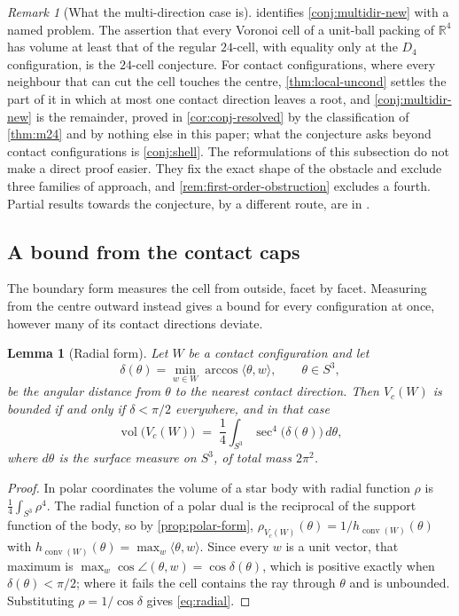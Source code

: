 \documentclass[11pt,reqno]{amsart}
\renewcommand{\_}{\origunderscore\allowbreak}
\numberwithin{equation}{section}
\theoremstyle{plain}
\newtheorem{lem}[thm]{Lemma}
\theoremstyle{definition}
\theoremstyle{remark}
\newtheorem{remark}[thm]{Remark}
\DeclareMathOperator{\vol}{vol}
\DeclareMathOperator{\conv}{conv}
\begin{document}
\begin{remark}[What the multi-direction case is]\label{rem:is-24cell}
 identifies \cref{conj:multidir-new} with a named
problem. The assertion that every Voronoi cell of a unit-ball
packing of $\mathbb{R}^4$ has volume at least that of the regular
$24$-cell, with equality only at the $D_4$ configuration, is the
$24$-cell conjecture. For contact configurations, where every
neighbour that can cut the cell touches the centre,
\cref{thm:local-uncond} settles the part of it in which at most one
contact direction leaves a root, and \cref{conj:multidir-new} is the
remainder, proved in \cref{cor:conj-resolved} by the classification of
\cref{thm:m24} and by nothing else in this paper; what the conjecture
asks beyond contact configurations is \cref{conj:shell}. The
reformulations of this subsection do not make a direct proof easier.
They fix the exact shape of the obstacle and exclude three families of
approach, and \cref{rem:first-order-obstruction} excludes a fourth. Partial results towards the
conjecture, by a different route, are in \cite{Mus18}.
\end{remark}

\subsection{A bound from the contact caps}\label{sec:covering-bound}

The boundary form measures the cell from outside, facet by facet.
Measuring from the centre outward instead gives a bound for every
configuration at once, however many of its contact directions deviate.

\begin{lem}[Radial form]\label{lem:radial-form}
Let $W$ be a contact configuration and let
\[
  \delta(\theta)=\min_{w\in W}\arccos\langle\theta,w\rangle ,
  \qquad \theta\in S^3,
\]
be the angular distance from $\theta$ to the nearest contact direction.
Then $V_c(W)$ is bounded if and only if $\delta<\pi/2$ everywhere, and in
that case
\begin{equation}\label{eq:radial}
  \vol\bigl(V_c(W)\bigr)
  \;=\;\frac14\int_{S^3}\sec^4\bigl(\delta(\theta)\bigr)\,d\theta ,
\end{equation}
where $d\theta$ is the surface measure on $S^3$, of total mass
$2\pi^2$.
\end{lem}

\begin{proof}
In polar coordinates the volume of a star body with radial function
$\rho$ is $\tfrac14\int_{S^3}\rho^4$. The radial function of a polar
dual is the reciprocal of the support function of the body, so by
\cref{prop:polar-form},
$\rho_{V_c(W)}(\theta)=1/h_{\conv(W)}(\theta)$ with
$h_{\conv(W)}(\theta)=\max_{w}\langle\theta,w\rangle$. Since every
$w$ is a unit vector, that maximum is
$\max_w\cos\angle(\theta,w)=\cos\delta(\theta)$, which is positive
exactly when $\delta(\theta)<\pi/2$; where it fails the cell contains
the ray through $\theta$ and is unbounded. Substituting
$\rho=1/\cos\delta$ gives \eqref{eq:radial}.
\end{proof}
\end{document}
